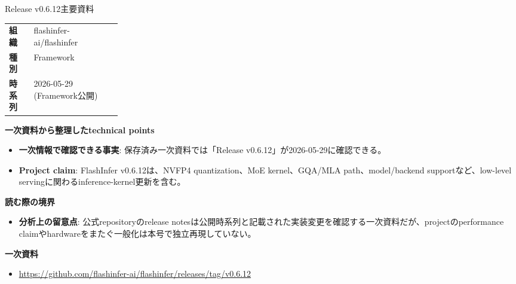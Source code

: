 \begin{technicalnote}{Release v0.6.12}{主要資料}
\begingroup
\begin{tabularx}{\linewidth}{@{}>{\bfseries}p{0.22\linewidth}X@{}}
組織 & flashinfer-ai/flashinfer \\
種別 & Framework \\
時系列 & 2026-05-29 (Framework公開) \\
\end{tabularx}
\smallskip
{\bfseries 一次資料から整理したtechnical points}
\begin{itemize}[leftmargin=1.5em,itemsep=0.35em]
\item \textbf{一次情報で確認できる事実}: 保存済み一次資料では「Release v0.6.12」が2026-05-29に確認できる。
\item \textbf{Project claim}: FlashInfer v0.6.12は、NVFP4 quantization、MoE kernel、GQA/MLA path、model/backend supportなど、low-level servingに関わるinference-kernel更新を含む。
\end{itemize}
{\bfseries 読む際の境界}
\begin{itemize}[leftmargin=1.5em,itemsep=0.35em]
\item \textbf{分析上の留意点}: 公式repositoryのrelease notesは公開時系列と記載された実装変更を確認する一次資料だが、projectのperformance claimやhardwareをまたぐ一般化は本号で独立再現していない。
\end{itemize}
\begin{samepage}
{\bfseries 一次資料}
\begingroup\sloppy
\begin{itemize}[leftmargin=1.5em,itemsep=0.25em]
\item {\scriptsize\url{https://github.com/flashinfer-ai/flashinfer/releases/tag/v0.6.12}}
\end{itemize}
\endgroup
\end{samepage}
\endgroup
\end{technicalnote}
\medskip

